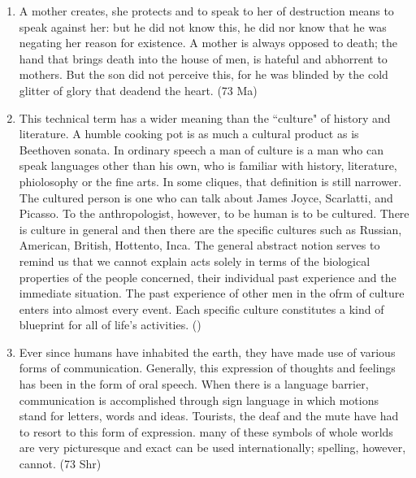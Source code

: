 \documentclass[12pt]{article}
\begin{document}
\begin{enumerate}
    \item A mother creates, she protects and to speak to her of destruction means to speak against her: but he did not know this, he did nor know that he was negating her reason for existence. A mother is always opposed to death; the hand that brings death into the house of men, is hateful and abhorrent to mothers. But the son did not perceive this, for he was blinded by the cold glitter of glory that deadend the heart. \hfill (73 Ma)

    \item This technical term has a wider meaning than the ``culture" of history and literature. A humble cooking pot is as much a cultural product as is Beethoven sonata. In ordinary speech a man of culture is a man who can speak languages other than his own, who is familiar with history, literature, phiolosophy or the fine arts. In some cliques, that definition is still narrower. The cultured person is one who can talk about James Joyce, Scarlatti, and Picasso. To the anthropologist, however, to be human is to be cultured. There is culture in general and then there are the specific cultures such as Russian, American, British, Hottento, Inca. The general abstract notion serves to remind us that we cannot explain acts solely in terms of the biological properties of the people concerned, their individual past experience and the immediate situation. The past experience of other men in the ofrm of culture enters into almost every event. Each specific culture constitutes a kind of blueprint for all of life's activities. \hfill ()

    \item Ever since humans have inhabited the earth, they have made use of various forms of communication. Generally, this expression of thoughts and feelings has been in the form of oral speech. When there is a language barrier, communication is accomplished through sign language in which motions stand for letters, words and ideas. Tourists, the deaf and the mute have had to resort to this form of expression. many of these symbols of whole worlds are very picturesque and exact can be used internationally; spelling, however, cannot. \hfill (73 Shr)


\end{enumerate}
\end{document}
